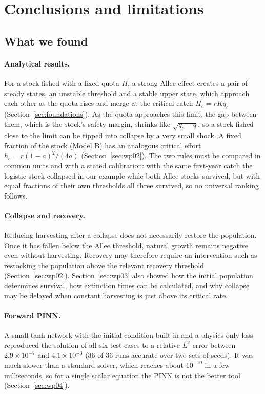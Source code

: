 \section{Conclusions and limitations}
\label{sec:conclusions}

\subsection{What we found}
\paragraph{Analytical results.} For a stock fished with a fixed quota $H$, a strong Allee effect creates a pair of steady states, an unstable threshold and a stable upper state, which approach each other as the quota rises and merge at the critical catch $H_c=rKq_c$ (Section~\ref{sec:foundations}). As the quota approaches this limit, the gap between them, which is the stock's safety margin, shrinks like $\sqrt{q_c-q}$, so a stock fished close to the limit can be tipped into collapse by a very small shock. A fixed fraction of the stock (Model B) has an analogous critical effort $h_c=r(1-a)^2/(4a)$ (Section~\ref{sec:wp02}). The two rules must be compared in common units and with a stated calibration: with the same first-year catch the logistic stock collapsed in our example while both Allee stocks survived, but with equal fractions of their own thresholds all three survived, so no universal ranking follows.


\paragraph{Collapse and recovery.}
Reducing harvesting after a collapse does not necessarily
restore the population. Once it has fallen below the
Allee threshold, natural growth remains negative even
without harvesting. Recovery may therefore require
an intervention such as restocking the population above
the relevant recovery threshold
(Section~\ref{sec:wp02}).
Section~\ref{sec:wp03} also showed how the initial
population determines survival, how extinction times
can be calculated, and why collapse may be delayed
when constant harvesting is just above its critical rate.


\paragraph{Forward PINN.} A small tanh network with the initial condition built in and a physics-only loss reproduced the solution of all six test cases to a relative $L^2$ error between $2.9\times10^{-7}$ and $4.1\times10^{-3}$ (36 of 36 runs accurate over two sets of seeds). It was much slower than a standard solver, which reaches about $10^{-10}$ in a few milliseconds, so for a single scalar equation the PINN is not the better tool (Section~\ref{sec:wp04}).

